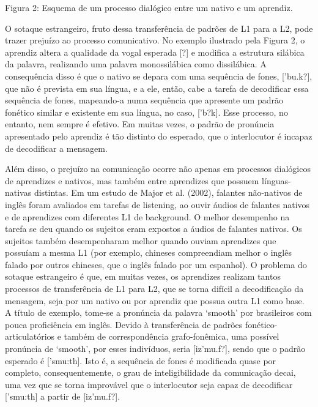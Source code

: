 Figura 2: Esquema de um processo dial\'ogico entre um nativo e um
aprendiz.

O sotaque estrangeiro, fruto dessa transfer\^encia de padr\~oes de L1 para a
L2, pode trazer preju\'izo ao processo comunicativo. No exemplo ilustrado
pela Figura 2, o aprendiz altera a qualidade da vogal esperada {[}?{]} e
modifica a estrutura sil\'abica da palavra, realizando uma palavra
monossil\'abica como dissil\'abica. A consequ\^encia disso \'e que o nativo se
depara com uma sequ\^encia de fones, {[}'bu.k?{]}, que n\~ao \'e prevista em
sua l\'ingua, e a ele, ent\~ao, cabe a tarefa de decodificar essa sequ\^encia
de fones, mapeando-a numa sequ\^encia que apresente um padr\~ao fon\'etico
similar e existente em sua l\'ingua, no caso, {[}'b?k{]}. Esse processo,
no entanto, nem sempre \'e efetivo. Em muitas vezes, o padr\~ao de pron\'uncia
apresentado pelo aprendiz \'e t\~ao distinto do esperado, que o interlocutor
\'e incapaz de decodificar a mensagem.

Al\'em disso, o preju\'izo na comunica\c{c}\~ao ocorre n\~ao apenas em processos
dial\'ogicos de aprendizes e nativos, mas tamb\'em entre aprendizes que
possuem l\'inguas-nativas distintas. Em um estudo de Major et al. (2002),
falantes n\~ao-nativos de ingl\^es foram avaliados em tarefas de listening,
ao ouvir \'audios de falantes nativos e de aprendizes com diferentes L1 de
background. O melhor desempenho na tarefa se deu quando os sujeitos eram
expostos a \'audios de falantes nativos. Os sujeitos tamb\'em desempenharam
melhor quando ouviam aprendizes que possu\'iam a mesma L1 (por exemplo,
chineses compreendiam melhor o ingl\^es falado por outros chineses, que o
ingl\^es falado por um espanhol). O problema do sotaque estrangeiro \'e que,
em muitas vezes, os aprendizes realizam tantos processos de
transfer\^encia de L1 para L2, que se torna dif\'icil a decodifica\c{c}\~ao da
mensagem, seja por um nativo ou por aprendiz que possua outra L1 como
base. A t\'itulo de exemplo, tome-se a pron\'uncia da palavra `smooth' por
brasileiros com pouca profici\^encia em ingl\^es. Devido à transfer\^encia de
padr\~oes fon\'etico-articulat\'orios e tamb\'em de correspond\^encia
grafo-fon\^emica, uma poss\'ivel pron\'uncia de `smooth', por esses
indiv\'iduos, seria {[}iz'mu.f?{]}, sendo que o padr\~ao esperado \'e
{[}'smu:th{]}. Isto \'e, a sequ\^encia de fones \'e modificada quase por
completo, consequentemente, o grau de inteligibilidade da comunica\c{c}\~ao
decai, uma vez que se torna improv\'avel que o interlocutor seja capaz de
decodificar {[}'smu:th{]} a partir de {[}iz'mu.f?{]}.

